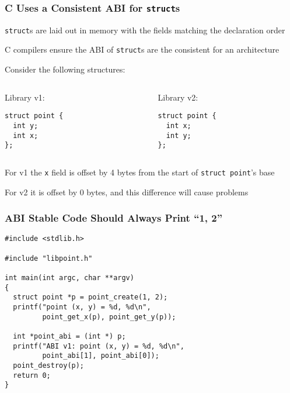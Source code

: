   \begin{frame}[fragile]
    \frametitle{C Uses a Consistent ABI for \texttt{struct}s}

    \texttt{struct}s are laid out in memory with the fields matching the
    declaration order

    \hspace{2em} C compilers ensure the ABI of \texttt{struct}s are the
    consistent for an architecture

    \vspace{2em}

    Consider the following structures:

    \vspace{1em}

    \begin{columns}
      \begin{column}{0.4\textwidth}
        Library v1:
        \begin{lstlisting}[basicstyle=\small\ttfamily]
struct point {
  int y;
  int x;
};
        \end{lstlisting}
      \end{column}
      \begin{column}{0.4\textwidth}
        Library v2:
        \begin{lstlisting}[basicstyle=\small\ttfamily]
struct point {
  int x;
  int y;
};
        \end{lstlisting}
      \end{column}
    \end{columns}

    \vspace{1em}

    For v1 the \texttt{x} field is offset by 4 bytes from the start of
    \texttt{struct point}'s base

    \hspace{2em} For v2 it is offset by 0 bytes, and this difference
    will cause problems
  \end{frame}

  \begin{frame}[fragile]
    \frametitle{ABI Stable Code Should Always Print ``1, 2''}

    \begin{lstlisting}[basicstyle=\small\ttfamily]
#include <stdlib.h>

#include "libpoint.h"

int main(int argc, char **argv)
{
  struct point *p = point_create(1, 2);
  printf("point (x, y) = %d, %d\n",
         point_get_x(p), point_get_y(p));

  int *point_abi = (int *) p;
  printf("ABI v1: point (x, y) = %d, %d\n",
         point_abi[1], point_abi[0]);
  point_destroy(p);
  return 0;
}
    \end{lstlisting}

  \end{frame}

